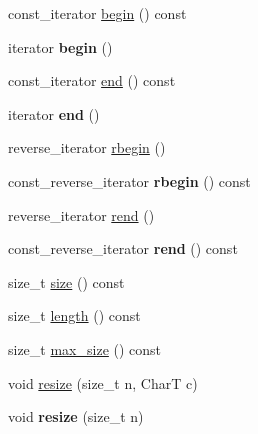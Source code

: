 \begin{CompactItemize}
\item 
const\_\-iterator \hyperlink{classvector__string_8e6b66cfacb75c8ae4990096c841a812}{begin} () const 
\item 
\hypertarget{classvector__string_a2abfc7d006cc0da5dd4db866d1c5197}{
iterator \textbf{begin} ()}
\label{classvector__string_a2abfc7d006cc0da5dd4db866d1c5197}

\item 
const\_\-iterator \hyperlink{classvector__string_e6d3431c0ea1a2e0152677b56230a4fa}{end} () const 
\item 
\hypertarget{classvector__string_37ebe2f29a902b33393b3bffbf53f0ef}{
iterator \textbf{end} ()}
\label{classvector__string_37ebe2f29a902b33393b3bffbf53f0ef}

\item 
reverse\_\-iterator \hyperlink{classvector__string_8fc790b60af4ce060a8bfc9429d3ede2}{rbegin} ()
\item 
\hypertarget{classvector__string_46fd59fdab8b311cfdbc723ce515fec4}{
const\_\-reverse\_\-iterator \textbf{rbegin} () const }
\label{classvector__string_46fd59fdab8b311cfdbc723ce515fec4}

\item 
reverse\_\-iterator \hyperlink{classvector__string_d4bd42b7a1799784b864bb0d1a143453}{rend} ()
\item 
\hypertarget{classvector__string_11452fd2d69cb408877703b252938c90}{
const\_\-reverse\_\-iterator \textbf{rend} () const }
\label{classvector__string_11452fd2d69cb408877703b252938c90}

\item 
size\_\-t \hyperlink{classvector__string_04d1b575101326449857d05ac08b0f79}{size} () const 
\item 
size\_\-t \hyperlink{classvector__string_bed831c659ff65631f4f15212f1f1537}{length} () const 
\item 
size\_\-t \hyperlink{classvector__string_d971eef9c6f24f1292a3a52d7b66d43f}{max\_\-size} () const 
\item 
void \hyperlink{classvector__string_dd247a6af30053ac812a485ba12d9369}{resize} (size\_\-t n, CharT c)
\item 
\hypertarget{classvector__string_2967523f3b74ac38c0b55a735caf5d85}{
void \textbf{resize} (size\_\-t n)}
\label{classvector__string_2967523f3b74ac38c0b55a735caf5d85}


\end{CompactItemize}
